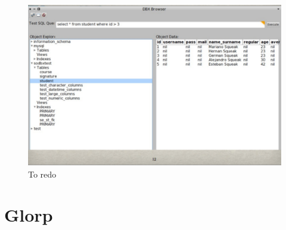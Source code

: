 \documentclass[a4paper,10pt,twoside]{book}
\begin{document}
\begin{figure}
\begin{center}
\includegraphics[width=\linewidth]{Browser}
\caption{To redo}
\end{center}
\end{figure}

\section{Glorp}






\ifx\wholebook\relax\else
   
   
\end{document}
